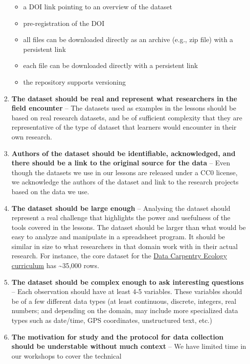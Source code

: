 \documentclass[]{book}
\providecommand{\tightlist}{%
  \setlength{\itemsep}{0pt}\setlength{\parskip}{0pt}}
\begin{document}
\begin{enumerate}
  \begin{itemize}
  \tightlist
  \item
    a DOI link pointing to an overview of the dataset
  \item
    pre-registration of the DOI
  \item
    all files can be downloaded directly as an archive (e.g., zip file) with a persistent link
  \item
    each file can be downloaded directly with a persistent link
  \item
    the repository supports versioning
  \end{itemize}
\item
  \textbf{The dataset should be real and represent what researchers in the field encounter} --
  The datasets used as examples in the
  lessons should be based on real research datasets, and be of sufficient complexity that they
  are representative of the type of dataset that learners would encounter in their own
  research.
\item
  \textbf{Authors of the dataset should be identifiable, acknowledged, and there should be a link to the original source for the data} -- Even though the datasets we use in our lessons are
  released under a CC0 license, we acknowledge the authors of the dataset and link to
  the research projects based on the data we use.
\item
  \textbf{The dataset should be large enough} -- Analysing the dataset should represent a real
  challenge that
  highlights the power and usefulness of the tools covered in the lessons. The dataset should
  be larger than what would be easy to analyze and manipulate in a spreadsheet program. It
  should be similar in size to what researchers in that domain work with in their actual
  research. For instance, the core dataset for the \href{https://datacarpentry.org/ecology-workshop/data/}{Data Carpentry Ecology curriculum} has \textasciitilde{}35,000 rows.
\item
  \textbf{The dataset should be complex enough to ask interesting questions} -- Each observation
  should have at least 4-5 variables. These variables should be of a few
  different data types (at least continuous, discrete, integers, real numbers; and depending
  on the domain, may include more specialized data types such as date/time, GPS coordinates, unstructured text, etc.)
\item
  \textbf{The motivation for study and the protocol for data collection should be understable without much context} -- We have limited time in our workshops to cover the technical

\end{enumerate}
\end{document}

